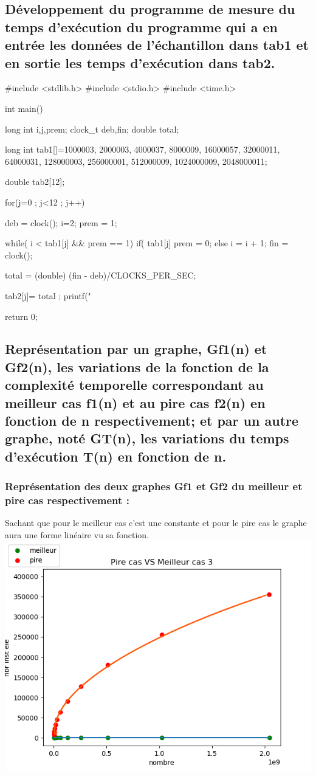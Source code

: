 \documentclass[12pt]{article}
\begin{document}
\subsection{Développement du programme de mesure du temps d'exécution du programme qui a en entrée les données de l'échantillon dans tab1 et en sortie les temps d'exécution dans tab2. }
\begin{sql}
#include <stdlib.h>
#include <stdio.h>
#include <time.h>

int main()
{
	long int i,j,prem;
	clock_t deb,fin;
	double total;

	long int tab1[]={1000003, 2000003,	4000037,	8000009,	16000057,	32000011,	64000031,
	128000003,	256000001,	512000009,	1024000009,	2048000011};

	double tab2[12];

for(j=0 ; j<12 ; j++)
{
	deb = clock();
	i=2;
	prem = 1;

	while( i < tab1[j] && prem == 1){
		if( tab1[j]%
			prem = 0;
		else
			i = i + 1;
	}
	fin = clock();

	total = (double) (fin - deb)/CLOCKS_PER_SEC;
	
	tab2[j]= total ;
	printf("%
}
return 0;
}
\end{sql}

\subsection{Représentation par un graphe, Gf1(n) et Gf2(n), les variations de la fonction de la complexité temporelle correspondant au meilleur cas f1(n) et au pire cas f2(n) en fonction de n respectivement; et par un autre graphe, noté GT(n), les variations  du temps d'exécution T(n) en fonction de n.}


\subsubsection{Représentation des deux graphes Gf1 et Gf2 du meilleur et pire cas respectivement :}
Sachant que pour le meilleur cas c'est une constante et pour le pire cas le graphe aura une forme linéaire vu sa fonction.
\\
\includegraphics[width=1\textwidth]{graphe/Pire_VS_Meilleur_cas3.png}
\end{document}
